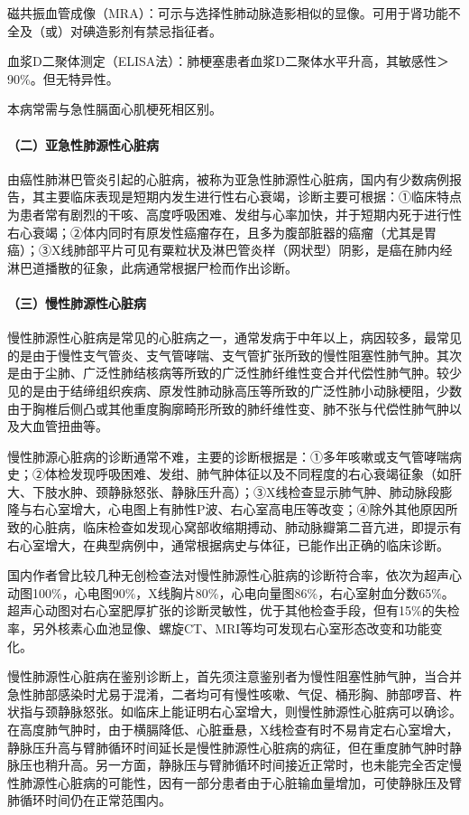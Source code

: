 磁共振血管成像（MRA）：可示与选择性肺动脉造影相似的显像。可用于肾功能不全及（或）对碘造影剂有禁忌指征者。

血浆D二聚体测定（ELISA法）：肺梗塞患者血浆D二聚体水平升高，其敏感性＞90\%。但无特异性。

本病常需与急性膈面心肌梗死相区别。

\paragraph{（二）亚急性肺源性心脏病}

由癌性肺淋巴管炎引起的心脏病，被称为亚急性肺源性心脏病，国内有少数病例报告，其主要临床表现是短期内发生进行性右心衰竭，诊断主要可根据：①临床特点为患者常有剧烈的干咳、高度呼吸困难、发绀与心率加快，并于短期内死于进行性右心衰竭；②体内同时有原发性癌瘤存在，且多为腹部脏器的癌瘤（尤其是胃癌）；③X线肺部平片可见有粟粒状及淋巴管炎样（网状型）阴影，是癌在肺内经淋巴道播散的征象，此病通常根据尸检而作出诊断。

\paragraph{（三）慢性肺源性心脏病}

慢性肺源性心脏病是常见的心脏病之一，通常发病于中年以上，病因较多，最常见的是由于慢性支气管炎、支气管哮喘、支气管扩张所致的慢性阻塞性肺气肿。其次是由于尘肺、广泛性肺结核病等所致的广泛性肺纤维性变合并代偿性肺气肿。较少见的是由于结缔组织疾病、原发性肺动脉高压等所致的广泛性肺小动脉梗阻，少数由于胸椎后侧凸或其他重度胸廓畸形所致的肺纤维性变、肺不张与代偿性肺气肿以及大血管扭曲等。

慢性肺源心脏病的诊断通常不难，主要的诊断根据是：①多年咳嗽或支气管哮喘病史；②体检发现呼吸困难、发绀、肺气肿体征以及不同程度的右心衰竭征象（如肝大、下肢水肿、颈静脉怒张、静脉压升高）；③X线检查显示肺气肿、肺动脉段膨隆与右心室增大，心电图上有肺性P波、右心室高电压等改变；④除外其他原因所致的心脏病，临床检查如发现心窝部收缩期搏动、肺动脉瓣第二音亢进，即提示有右心室增大，在典型病例中，通常根据病史与体征，已能作出正确的临床诊断。

国内作者曾比较几种无创检查法对慢性肺源性心脏病的诊断符合率，依次为超声心动图100\%，心电图90\%，X线胸片80\%，心电向量图86\%，右心室射血分数65\%。超声心动图对右心室肥厚扩张的诊断灵敏性，优于其他检查手段，但有15\%的失检率，另外核素心血池显像、螺旋CT、MRI等均可发现右心室形态改变和功能变化。

慢性肺源性心脏病在鉴别诊断上，首先须注意鉴别者为慢性阻塞性肺气肿，当合并急性肺部感染时尤易于混淆，二者均可有慢性咳嗽、气促、桶形胸、肺部啰音、杵状指与颈静脉怒张。如临床上能证明右心室增大，则慢性肺源性心脏病可以确诊。在高度肺气肿时，由于横膈降低、心脏垂悬，X线检查有时不易肯定右心室增大，静脉压升高与臂肺循环时间延长是慢性肺源性心脏病的病征，但在重度肺气肿时静脉压也稍升高。另一方面，静脉压与臂肺循环时间接近正常时，也未能完全否定慢性肺源性心脏病的可能性，因有一部分患者由于心脏输血量增加，可使静脉压及臂肺循环时间仍在正常范围内。


